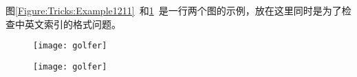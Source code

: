 



图\ref{Figure:Tricks:Example1211}~和\ref{Figure:Tricks:Example12222}~是一行两个图的示例，放在这里同时是为了检查中英文索引的格式问题。
\begin{figure}[htbp]
\centering
\begin{minipage}[t]{0.4\textwidth}
\centering
\texttt{[image: golfer]}\vspace{-5mm}
\label{Figure:Tricks:Example1211}
\end{minipage}\hspace{1cm}
\begin{minipage}[t]{0.4\textwidth}
\centering
\texttt{[image: golfer]}\vspace{-5mm}
\label{Figure:Tricks:Example12222}
\end{minipage}
\end{figure}
